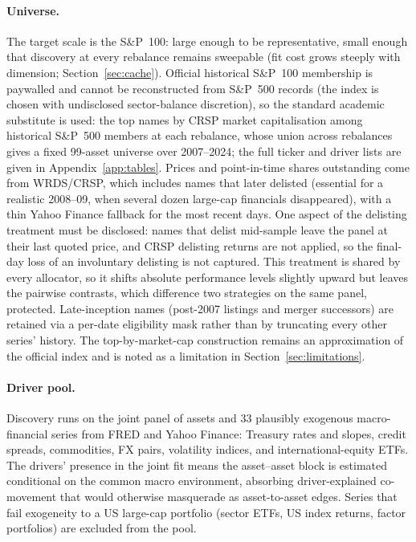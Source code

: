 \paragraph{Universe.} The target scale is the S\&P~100: large enough to be
representative, small enough that discovery at every rebalance remains
sweepable (fit cost grows steeply with dimension;
Section~\ref{sec:cache}). Official historical S\&P~100 membership is
paywalled and cannot be reconstructed from S\&P~500 records (the index is
chosen with undisclosed sector-balance discretion), so the standard
academic substitute is used: the top names by CRSP market capitalisation
among historical S\&P~500 members at each rebalance, whose union across
rebalances gives a fixed 99-asset universe over 2007--2024; the full
ticker and driver lists are given in Appendix~\ref{app:tables}. Prices and
point-in-time shares outstanding come from WRDS/CRSP, which includes names
that later delisted (essential for a realistic 2008--09, when several dozen
large-cap financials disappeared), with a thin Yahoo Finance fallback for
the most recent days. One aspect of the delisting treatment must be
disclosed: names that delist mid-sample leave the panel at their last
quoted price, and CRSP delisting returns are not applied, so the final-day
loss of an involuntary delisting is not captured. This treatment is shared
by every allocator, so it shifts absolute performance levels slightly
upward but leaves the pairwise contrasts, which difference two strategies
on the same panel, protected. Late-inception names (post-2007 listings and merger
successors) are retained via a per-date eligibility mask rather than by
truncating every other series' history. The top-by-market-cap construction
remains an approximation of the official index and is noted as a limitation
in Section~\ref{sec:limitations}.

\paragraph{Driver pool.} Discovery runs on the joint panel of assets
and 33 plausibly exogenous macro-financial series from FRED and Yahoo Finance:
Treasury rates and slopes, credit spreads, commodities, FX pairs, volatility
indices, and international-equity ETFs. The drivers' presence in the joint
fit means the
asset--asset block is estimated conditional on the common macro
environment, absorbing driver-explained co-movement that would otherwise
masquerade as asset-to-asset edges. Series that fail exogeneity to a US
large-cap portfolio (sector ETFs, US index returns, factor portfolios)
are excluded from the pool.

